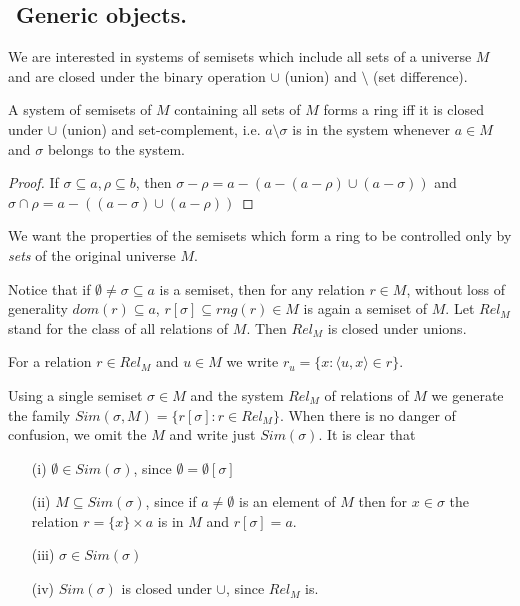 \subsection{${}$ \hspace{-1em}Generic objects.}
We are interested in systems of semisets which include all sets of a universe $M$ and are closed under the binary operation $\cup$ (union) and
$\setminus$ (set difference).

\begin{fact}
A system of semisets of $M$ containing all sets of $M$ forms a ring iff it is closed under $\cup$ (union) and set-complement, i.e. $a\setminus \sigma$
is in the system whenever $a\in M$ and $\sigma$ belongs to the system.
\end{fact}

\begin{proof}
If $\sigma\subseteq a,\rho\subseteq b$, then $\sigma-\rho=a-(a-(a-\rho)\cup(a-\sigma))$ and $\sigma\cap\rho=a-((a-\sigma)\cup(a-\rho))$
\end{proof}

We want the properties of the semisets which form a ring to be controlled only by \emph{sets} of the original universe $M$.

\smallskip

Notice that if $\emptyset\neq\sigma\subseteq a$ is a semiset, then for any relation $r\in M$, without loss of generality $dom(r)\subseteq a$,
$r[\sigma]\subseteq rng(r)\in M$ is again a semiset of $M$. Let $Rel_M$ stand for the class of all relations of $M$. Then $Rel_M$ is closed under
unions.

\begin{notation}
For a relation $r\in Rel_M$ and $u\in M$ we write $r_u=\{x:\langle u,x\rangle\in r\}$.
\end{notation}

Using a single semiset $\sigma\in M$ and the system $Rel_M$ of relations of $M$ we generate the family $Sim(\sigma,M)=\{r[\sigma]:r\in Rel_M\}$. When
there is no danger of confusion, we omit the $M$ and write just $Sim(\sigma)$. It is clear that

\begin{itemize}
\item[(i)] $\emptyset\in Sim(\sigma)$, since $\emptyset = \emptyset[\sigma]$
\item[(ii)] $M\subseteq Sim(\sigma)$, since if $a\neq\emptyset$ is an element of $M$ then for $x\in\sigma$ the relation $r=\{x\}\times a$ is in $M$ and
$r[\sigma]=a$.
\item[(iii)] $\sigma\in Sim(\sigma)$
\item[(iv)] $Sim(\sigma)$ is closed under $\cup$, since $Rel_M$ is.
\end{itemize}

